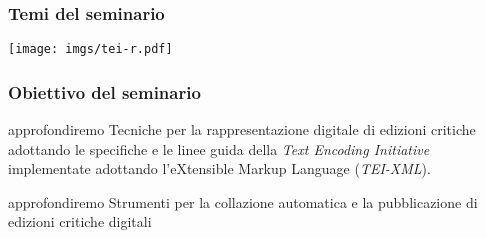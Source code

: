 \documentclass{beamer}
\begin{document}

\begin{frame}
	\frametitle{Temi del seminario}
	\addtocounter{nframe}{1}

	\begin{center}
		\texttt{[image: imgs/tei-r.pdf]}
	\end{center}

\end{frame}

\begin{frame}
	\frametitle{Obiettivo del seminario}
	\addtocounter{nframe}{1}

	\begin{block}{approfondiremo}
		Tecniche per la rappresentazione digitale di edizioni critiche adottando le specifiche e le linee guida della \textit{Text Encoding Initiative} implementate adottando l'eXtensible Markup Language (\textit{TEI-XML}).
	\end{block}
	\begin{block}{approfondiremo}
		Strumenti per la collazione automatica e la pubblicazione di edizioni critiche digitali
	\end{block}

\end{frame}

    



\end{document}
